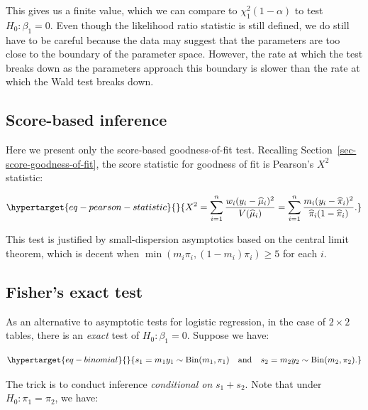\documentclass[
  11pt,
  letterpaper,
  oneside]{book}
\theoremstyle{plain}
\theoremstyle{plain}
\theoremstyle{definition}
\theoremstyle{definition}
\theoremstyle{plain}
\theoremstyle{remark}
\begin{document}
This gives us a finite value, which we can compare to
\(\chi^2_{1}(1-\alpha)\) to test \(H_0: \beta_1 = 0\). Even though the
likelihood ratio statistic is still defined, we do still have to be
careful because the data may suggest that the parameters are too close
to the boundary of the parameter space. However, the rate at which the
test breaks down as the parameters approach this boundary is slower than
the rate at which the Wald test breaks down.

\hypertarget{sec-score-based-inference}{%
\subsection{Score-based inference}\label{sec-score-based-inference}}

Here we present only the score-based goodness-of-fit test. Recalling
Section~\ref{sec-score-goodness-of-fit}, the score statistic for
goodness of fit is Pearson's \(X^2\) statistic:

\begin{equation}\protect\hypertarget{eq-pearson-statistic}{}{
X^2 = \sum_{i = 1}^n \frac{w_i (y_i - \widehat \mu_i)^2}{V(\widehat \mu_i)} = \sum_{i = 1}^n \frac{m_i(y_i - \widehat \pi_i)^2}{\widehat \pi_i(1-\widehat \pi_i)}.
}\label{eq-pearson-statistic}\end{equation}

This test is justified by small-dispersion asymptotics based on the
central limit theorem, which is decent when
\(\min(m_i \pi_i, (1-m_i)\pi_i) \geq 5\) for each \(i\).

\hypertarget{sec-fisher-exact-test}{%
\subsection{Fisher's exact test}\label{sec-fisher-exact-test}}

As an alternative to asymptotic tests for logistic regression, in the
case of \(2 \times 2\) tables, there is an \emph{exact} test of
\(H_0: \beta_1 = 0\). Suppose we have:

\begin{equation}\protect\hypertarget{eq-binomial}{}{
s_1 = m_1y_1 \sim \text{Bin}(m_1, \pi_1) \quad \text{and} \quad s_2 = m_2y_2 \sim \text{Bin}(m_2, \pi_2).
}\label{eq-binomial}\end{equation}

The trick is to conduct inference \emph{conditional on} \(s_1 + s_2\).
Note that under \(H_0: \pi_1 = \pi_2\), we have:
\end{document}

